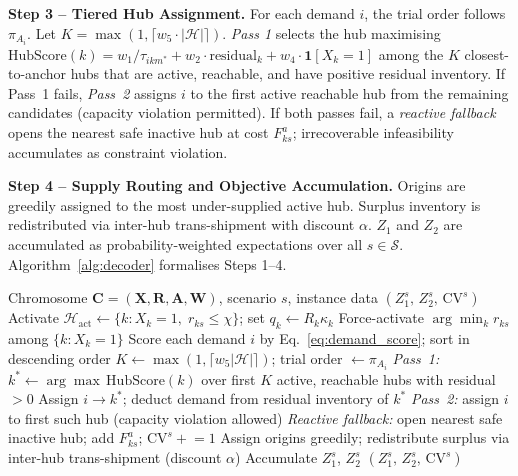 \documentclass{llncs}
\begin{document}
\textbf{Step 3 -- Tiered Hub Assignment.} For each demand $i$, the trial order follows $\pi_{A_i}$. Let $K = \max(1, \lceil w_5 \cdot |\mathcal{H}| \rceil)$. \textit{Pass 1} selects the hub maximising $\text{HubScore}(k) = w_1/\tau_{ikm^*} + w_2 \cdot \text{residual}_k + w_4 \cdot \mathbf{1}[X_k=1]$ among the $K$ closest-to-anchor hubs that are active, reachable, and have positive residual inventory. If Pass~1 fails, \textit{Pass~2} assigns $i$ to the first active reachable hub from the remaining candidates (capacity violation permitted). If both passes fail, a \textit{reactive fallback} opens the nearest safe inactive hub at cost $F^a_{ks}$; irrecoverable infeasibility accumulates as constraint violation.

\textbf{Step 4 -- Supply Routing and Objective Accumulation.} Origins are greedily assigned to the most under-supplied active hub. Surplus inventory is redistributed via inter-hub trans-shipment with discount $\alpha$. $Z_1$ and $Z_2$ are accumulated as probability-weighted expectations over all $s \in \mathcal{S}$. Algorithm~\ref{alg:decoder} formalises Steps 1--4.

\begin{algorithm}[htbp]
\caption{Priority-Based Decoder (single scenario $s$)}
\label{alg:decoder}
\begin{algorithmic}[1]
\REQUIRE Chromosome $\mathbf{C}=(\mathbf{X},\mathbf{R},\mathbf{A},\mathbf{W})$, scenario $s$, instance data
\ENSURE $(Z_1^s,\,Z_2^s,\,\text{CV}^s)$
\STATE Activate $\mathcal{H}_{\text{act}}\leftarrow\{k:X_k\!=\!1,\;r_{ks}\!\le\!\chi\}$; set $q_k\!\leftarrow\!R_k\kappa_k$
 \STATE Force-activate $\arg\min_k r_{ks}$ among $\{k:X_k\!=\!1\}$ \ENDIF
\STATE Score each demand $i$ by Eq.~\eqref{eq:demand_score}; sort in descending order
    \STATE $K\leftarrow\max(1,\lceil w_5|\mathcal{H}|\rceil)$; trial order $\leftarrow\pi_{A_i}$
    \STATE \textit{Pass~1:} $k^*\leftarrow\arg\max\,\text{HubScore}(k)$ over first $K$ active, reachable hubs with residual~$>0$
        \STATE Assign $i\!\to\!k^*$; deduct demand from residual inventory of $k^*$
        \STATE \textit{Pass~2:} assign $i$ to first such hub (capacity violation allowed)
    \ELSE
        \STATE \textit{Reactive fallback:} open nearest safe inactive hub; add $F^a_{ks}$; $\text{CV}^s\!\mathrel{+}=\!1$
    \ENDIF
\ENDFOR
\STATE Assign origins greedily; redistribute surplus via inter-hub trans-shipment (discount $\alpha$)
\STATE Accumulate $Z_1^s$, $Z_2^s$
\RETURN $(Z_1^s,\,Z_2^s,\,\text{CV}^s)$
\end{algorithmic}
\end{algorithm}
\end{document}
